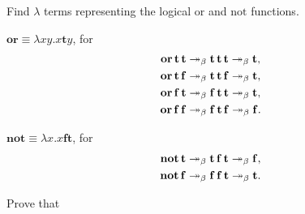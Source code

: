 \documentclass{homework}
\begin{document}
\begin{problem}
  Find $\lambda$ terms representing the logical $\mathrm{or}$ and $\mathrm{not}$
  functions.
\end{problem}

\begin{solution}

  $\mathbf{or} \equiv \lambda xy.x\mathbf{t}y$, for
  \begin{align*}
    \mathbf{or}\, \mathbf{t}\,\mathbf{t} &\twoheadrightarrow_{\beta} \mathbf{t}\,\mathbf{t}\,\mathbf{t} \twoheadrightarrow_{\beta} \mathbf{t},\\
    \mathbf{or}\, \mathbf{t}\,\mathbf{f} &\twoheadrightarrow_{\beta} \mathbf{t}\,\mathbf{t}\,\mathbf{f} \twoheadrightarrow_{\beta} \mathbf{t},\\
    \mathbf{or}\, \mathbf{f}\,\mathbf{t} &\twoheadrightarrow_{\beta} \mathbf{f}\,\mathbf{t}\,\mathbf{t} \twoheadrightarrow_{\beta} \mathbf{t},\\
    \mathbf{or}\, \mathbf{f}\,\mathbf{f} &\twoheadrightarrow_{\beta} \mathbf{f}\,\mathbf{t}\,\mathbf{f} \twoheadrightarrow_{\beta} \mathbf{f}.
  \end{align*}

  $\mathbf{not} \equiv \lambda x.x\mathbf{f}\mathbf{t}$, for
  \begin{align*}
    \mathbf{not}\, \mathbf{t} &\twoheadrightarrow_{\beta} \mathbf{t}\,\mathbf{f}\,\mathbf{t} \twoheadrightarrow_{\beta} \mathbf{f},\\
    \mathbf{not}\, \mathbf{f} &\twoheadrightarrow_{\beta} \mathbf{f}\,\mathbf{f}\,\mathbf{t} \twoheadrightarrow_{\beta} \mathbf{t}.
  \end{align*}

\end{solution}

\begin{problem}
  Prove that
\end{problem}
\end{document}
